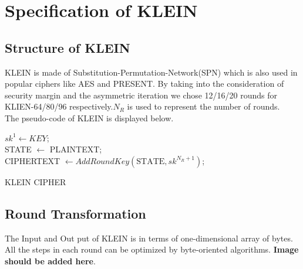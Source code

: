 \documentclass[preprint]{transcrypto}
\begin{document}
\section{Specification of KLEIN}

\subsection{Structure of KLEIN}
KLEIN is made of Substitution-Permutation-Network(SPN) which is also used in popular ciphers like AES and PRESENT. By taking into the consideration of security margin and the asymmetric iteration we chose 12/16/20 rounds for KLIEN-64/80/96 respectively.$N_{R}$ is used to represent the number of rounds.\\
The pseudo-code of KLEIN is displayed below.\\

\begin{algorithm}[H]
\SetAlgoLined
$sk^{1}\gets KEY$; \\
STATE $\gets$ PLAINTEXT;\\
 CIPHERTEXT $\gets AddRoundKey(\text{STATE}, sk^{N_{R}+1} )$;
 \caption{KLEIN CIPHER}
\end{algorithm}
\subsection{Round Transformation}
The Input and Out put of KLEIN is in terms of one-dimensional array of bytes. All the steps in each round can be optimized by byte-oriented algorithms. \textbf{Image should be added here}.
\end{document}
